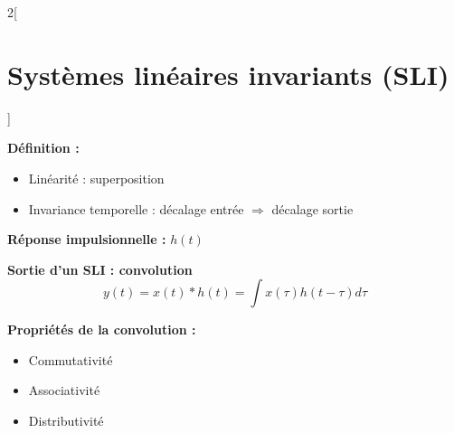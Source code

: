 \documentclass[a4paper,10pt]{article}
\begin{document}
    \begin{multicols}{2}[ 
        \section{Systèmes linéaires invariants (SLI)}
        ]

        \textbf{Définition :}
        \begin{itemize}
            \item Linéarité : superposition
            \item Invariance temporelle : décalage entrée $\Rightarrow$ décalage sortie
        \end{itemize}

        \textbf{Réponse impulsionnelle :} $h(t)$

        \textbf{Sortie d'un SLI : convolution}
        \[
        y(t) = x(t) * h(t) = \int x(\tau) h(t-\tau) d\tau
        \]

        \textbf{Propriétés de la convolution :}
        \begin{itemize}
            \item Commutativité
            \item Associativité
            \item Distributivité
        \end{itemize}

    \end{multicols}
\end{document}
